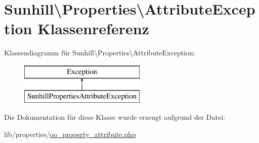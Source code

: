 \hypertarget{classSunhill_1_1Properties_1_1AttributeException}{}\section{Sunhill\textbackslash{}Properties\textbackslash{}Attribute\+Exception Klassenreferenz}
\label{classSunhill_1_1Properties_1_1AttributeException}
Klassendiagramm für Sunhill\textbackslash{}Properties\textbackslash{}Attribute\+Exception\+:\begin{figure}[H]
\begin{center}
\leavevmode
\includegraphics[height=2.000000cm]{d5/d3e/classSunhill_1_1Properties_1_1AttributeException}
\end{center}
\end{figure}


Die Dokumentation für diese Klasse wurde erzeugt aufgrund der Datei\+:\begin{DoxyCompactItemize}
\item 
lib/properties/\hyperlink{oo__property__attribute_8php}{oo\+\_\+property\+\_\+attribute.\+php}\end{DoxyCompactItemize}
